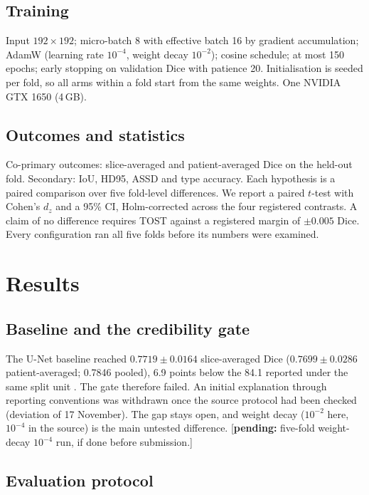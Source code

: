 \documentclass[11pt,a4paper]{article}
\newcommand{\pending}[1]{\textcolor{red!70!black}{[\textbf{pending:} #1]}}
\begin{document}
\subsection{Training}
Input $192\times192$; micro-batch 8 with effective batch 16 by gradient
accumulation; AdamW (learning rate $10^{-4}$, weight decay $10^{-2}$); cosine
schedule; at most 150 epochs; early stopping on validation Dice with patience 20.
Initialisation is seeded per fold, so all arms within a fold start from the same
weights. One NVIDIA GTX 1650 (4\,GB).

\subsection{Outcomes and statistics}
Co-primary outcomes: slice-averaged and patient-averaged Dice on the held-out fold.
Secondary: IoU, HD95, ASSD and type accuracy. Each hypothesis is a paired
comparison over five fold-level differences. We report a paired $t$-test with
Cohen's $d_z$ and a 95\% CI, Holm-corrected across the four registered contrasts.
A claim of no difference requires TOST against a registered margin of
$\pm0.005$ Dice. Every configuration ran all five folds before its numbers were
examined.

\section{Results}

\subsection{Baseline and the credibility gate}
The U-Net baseline reached $0.7719\pm0.0164$ slice-averaged Dice
($0.7699\pm0.0286$ patient-averaged; 0.7846 pooled), 6.9 points below the 84.1
reported under the same split unit \citep{yurdakul2026}. The gate therefore failed.
An initial explanation through reporting conventions was withdrawn once the source
protocol had been checked (deviation of 17 November). The gap stays open, and
weight decay ($10^{-2}$ here, $10^{-4}$ in the source) is the main untested
difference. \pending{five-fold weight-decay $10^{-4}$ run, if done before submission.}

\subsection{Evaluation protocol}
\label{sec:protocol}
\end{document}
